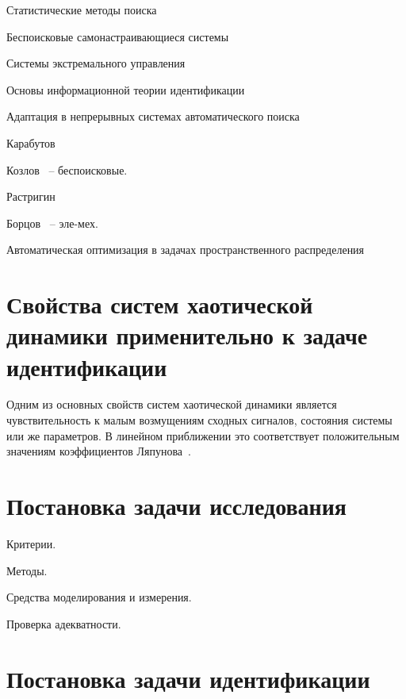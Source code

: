 Статистические методы поиска~\cite{rastr_stat_meth_search}

Беспоисковые самонастраивающиеся системы~\cite{kozlov_nosearch_sns}

Системы экстремального управления~\cite{rastr_seu,kras_dyn_nsn}

Основы информационной теории идентификации~\cite{info_cipkin,straton_inf,karabut}

Адаптация в непрерывных системах автоматического поиска~\cite{adopt_cont_sys}

Карабутов~\cite{karabutov_adapt_id_sys,saliga_id_ctl_black}

Козлов~\cite{kozlov_nosearch_sns} -- беспоисковые.

Растригин~\cite{rastr_stat_meth_search,rastr_seu,rastr_intro,rastr_adop_complex_sys,rastr_rand_search}

Борцов~\cite{borcov} -- эле-мех.

Автоматическая оптимизация в задачах пространственного распределения~\cite{auto_optim_intask}



\section{Свойства систем хаотической динамики применительно к задаче идентификации}  %

Одним из основных свойств систем хаотической динамики является чувствительность
к малым возмущениям сходных сигналов, состояния системы или же параметров.
В линейном приближении это соответствует положительным значениям
коэффициентов Ляпунова~\cite{magni_theory_dyn_chaos,moon_chaotic_vibr}.



\section{Постановка задачи исследования}  %

Критерии.

Методы.

Средства моделирования и измерения.

Проверка адекватности.



\section{Постановка задачи идентификации}  %

